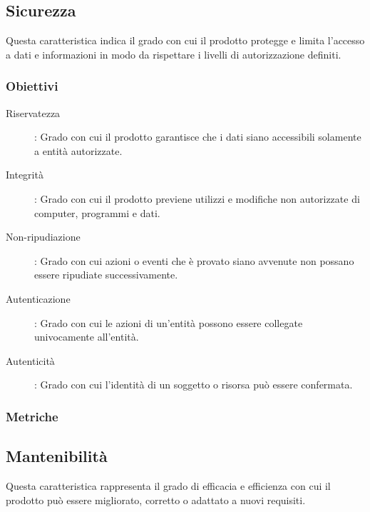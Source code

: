 \documentclass[../piano-di-qualifica.tex]{subfiles}
\begin{document}

\subsection{Sicurezza}%
\label{sub:sicurezza}
 Questa caratteristica indica il grado con cui il prodotto protegge e limita l'accesso a dati e informazioni in modo da rispettare i livelli di autorizzazione definiti.
  \subsubsection{Obiettivi}%
  \label{subs:obiettivi}
      \begin{description}
        \item [Riservatezza]: Grado con cui il prodotto garantisce che i dati siano accessibili solamente a entità autorizzate.
        \item [Integrità]: Grado con cui il prodotto previene utilizzi e modifiche non autorizzate di computer, programmi e dati.
        \item [Non-ripudiazione]: Grado con cui azioni o eventi che è provato siano avvenute non possano essere ripudiate successivamente.
        \item [Autenticazione]: Grado con cui le azioni di un'entità possono essere collegate univocamente all'entità.
        \item [Autenticità]: Grado con cui l'identità di un soggetto o risorsa può essere confermata.
      \end{description}

  \subsubsection{Metriche}%
  \label{subs:metriche}



\subsection{Mantenibilità}%
\label{sub:mantenibilita}
Questa caratteristica rappresenta il grado di efficacia e efficienza con cui il prodotto può essere migliorato, corretto o adattato a nuovi requisiti.
\end{document}
